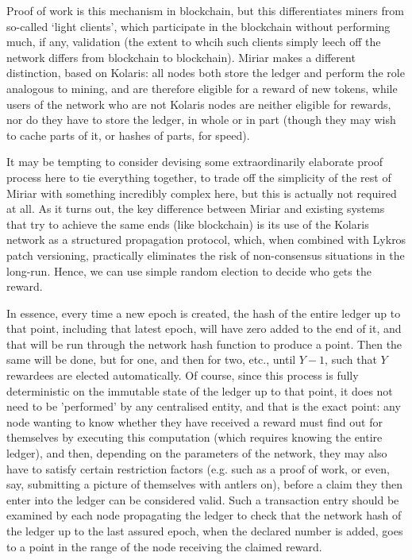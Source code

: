 \documentclass{extreport}
\begin{document}
Proof of work is this mechanism in blockchain, but this differentiates miners from so-called `light clients', which participate in the blockchain without performing much, if any, validation (the extent to whcih such clients simply leech off the network differs from blockchain to blockchain). Miriar makes a different distinction, based on Kolaris: all nodes both store the ledger and perform the role analogous to mining, and are therefore eligible for a reward of new tokens, while users of the network who are not Kolaris nodes are neither eligible for rewards, nor do they have to store the ledger, in whole or in part (though they may wish to cache parts of it, or hashes of parts, for speed).

It may be tempting to consider devising some extraordinarily elaborate proof process here to tie everything together, to trade off the simplicity of the rest of Miriar with something incredibly complex here, but this is actually not required at all. As it turns out, the key difference between Miriar and existing systems that try to achieve the same ends (like blockchain) is its use of the Kolaris network as a structured propagation protocol, which, when combined with Lykros patch versioning, practically eliminates the risk of non-consensus situations in the long-run. Hence, we can use simple random election to decide who gets the reward.

In essence, every time a new epoch is created, the hash of the entire ledger up to that point, including that latest epoch, will have zero added to the end of it, and that will be run through the network hash function to produce a point. Then the same will be done, but for one, and then for two, etc., until \(Y - 1\), such that \(Y\) rewardees are elected automatically. Of course, since this process is fully deterministic on the immutable state of the ledger up to that point, it does not need to be 'performed' by any centralised entity, and that is the exact point: any node wanting to know whether they have received a reward must find out for themselves by executing this computation (which requires knowing the entire ledger), and then, depending on the parameters of the network, they may also have to satisfy certain restriction factors (e.g. such as a proof of work, or even, say, submitting a picture of themselves with antlers on), before a claim they then enter into the ledger can be considered valid. Such a transaction entry should be examined by each node propagating the ledger to check that the network hash of the ledger up to the last assured epoch, when the declared number is added, goes to a point in the range of the node receiving the claimed reward.
\end{document}

